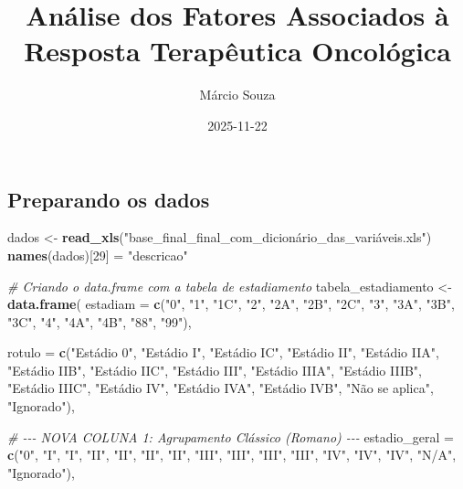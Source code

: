 \documentclass[
]{article}
\title{Análise dos Fatores Associados à Resposta Terapêutica Oncológica}
\author{Márcio Souza}
\date{2025-11-22}
\newenvironment{Shaded}{\begin{snugshade}}{\end{snugshade}}
\newcommand{\AttributeTok}[1]{\textcolor[rgb]{0.13,0.29,0.53}{#1}}
\newcommand{\CommentTok}[1]{\textcolor[rgb]{0.56,0.35,0.01}{\textit{#1}}}
\newcommand{\DecValTok}[1]{\textcolor[rgb]{0.00,0.00,0.81}{#1}}
\newcommand{\FunctionTok}[1]{\textcolor[rgb]{0.13,0.29,0.53}{\textbf{#1}}}
\newcommand{\NormalTok}[1]{#1}
\newcommand{\OtherTok}[1]{\textcolor[rgb]{0.56,0.35,0.01}{#1}}
\newcommand{\StringTok}[1]{\textcolor[rgb]{0.31,0.60,0.02}{#1}}
\begin{document}
\maketitle

\subsection{Preparando os dados}\label{preparando-os-dados}

\begin{Shaded}
\begin{Highlighting}[]
\NormalTok{dados }\OtherTok{\textless{}{-}} \FunctionTok{read\_xls}\NormalTok{(}\StringTok{"base\_final\_final\_com\_dicionário\_das\_variáveis.xls"}\NormalTok{)}
\FunctionTok{names}\NormalTok{(dados)[}\DecValTok{29}\NormalTok{] }\OtherTok{=} \StringTok{"descricao"}

\CommentTok{\# Criando o data.frame com a tabela de estadiamento}
\NormalTok{tabela\_estadiamento }\OtherTok{\textless{}{-}} \FunctionTok{data.frame}\NormalTok{(}
  \AttributeTok{estadiam =} \FunctionTok{c}\NormalTok{(}\StringTok{"0"}\NormalTok{, }\StringTok{"1"}\NormalTok{, }\StringTok{"1C"}\NormalTok{, }\StringTok{"2"}\NormalTok{, }\StringTok{"2A"}\NormalTok{, }\StringTok{"2B"}\NormalTok{, }\StringTok{"2C"}\NormalTok{, }
             \StringTok{"3"}\NormalTok{, }\StringTok{"3A"}\NormalTok{, }\StringTok{"3B"}\NormalTok{, }\StringTok{"3C"}\NormalTok{, }\StringTok{"4"}\NormalTok{, }\StringTok{"4A"}\NormalTok{, }\StringTok{"4B"}\NormalTok{, }
             \StringTok{"88"}\NormalTok{, }\StringTok{"99"}\NormalTok{),}
  
  \AttributeTok{rotulo =} \FunctionTok{c}\NormalTok{(}\StringTok{"Estádio 0"}\NormalTok{, }\StringTok{"Estádio I"}\NormalTok{, }\StringTok{"Estádio IC"}\NormalTok{, }
             \StringTok{"Estádio II"}\NormalTok{, }\StringTok{"Estádio IIA"}\NormalTok{, }\StringTok{"Estádio IIB"}\NormalTok{, }\StringTok{"Estádio IIC"}\NormalTok{, }
             \StringTok{"Estádio III"}\NormalTok{, }\StringTok{"Estádio IIIA"}\NormalTok{, }\StringTok{"Estádio IIIB"}\NormalTok{, }\StringTok{"Estádio IIIC"}\NormalTok{, }
             \StringTok{"Estádio IV"}\NormalTok{, }\StringTok{"Estádio IVA"}\NormalTok{, }\StringTok{"Estádio IVB"}\NormalTok{, }
             \StringTok{"Não se aplica"}\NormalTok{, }\StringTok{"Ignorado"}\NormalTok{),}
  
  \CommentTok{\# {-}{-}{-} NOVA COLUNA 1: Agrupamento Clássico (Romano) {-}{-}{-}}
  \AttributeTok{estadio\_geral =} \FunctionTok{c}\NormalTok{(}\StringTok{"0"}\NormalTok{, }\StringTok{"I"}\NormalTok{, }\StringTok{"I"}\NormalTok{, }
                    \StringTok{"II"}\NormalTok{, }\StringTok{"II"}\NormalTok{, }\StringTok{"II"}\NormalTok{, }\StringTok{"II"}\NormalTok{, }
                    \StringTok{"III"}\NormalTok{, }\StringTok{"III"}\NormalTok{, }\StringTok{"III"}\NormalTok{, }\StringTok{"III"}\NormalTok{, }
                    \StringTok{"IV"}\NormalTok{, }\StringTok{"IV"}\NormalTok{, }\StringTok{"IV"}\NormalTok{, }
                    \StringTok{"N/A"}\NormalTok{, }\StringTok{"Ignorado"}\NormalTok{),}
  

\end{Highlighting}
\end{Shaded}
\end{document}
